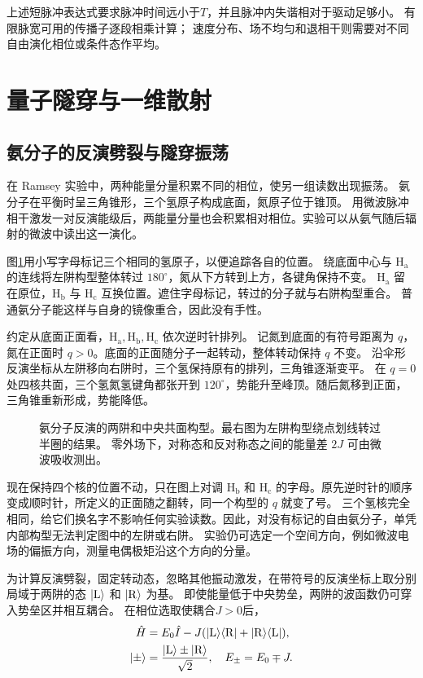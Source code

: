 上述短脉冲表达式要求脉冲时间远小于$T$，并且脉冲内失谐相对于驱动足够小。
有限脉宽可用的传播子逐段相乘计算；
速度分布、场不均匀和退相干则需要对不同自由演化相位或条件态作平均。

\section{量子隧穿与一维散射}
\label{sec:tunneling}
\subsection{氨分子的反演劈裂与隧穿振荡}
在 Ramsey 实验中，两种能量分量积累不同的相位，使另一组读数出现振荡。
氨分子在平衡时呈三角锥形，三个氢原子构成底面，氮原子位于锥顶。
用微波脉冲相干激发一对反演能级后，两能量分量也会积累相对相位。实验可以从氨气随后辐射的微波中读出这一演化。

图\ref{fig:ammonia-inversion}用小写字母标记三个相同的氢原子，以便追踪各自的位置。
绕底面中心与 $\mathrm{H_a}$ 的连线将左阱构型整体转过 $180^\circ$，氮从下方转到上方，各键角保持不变。
$\mathrm{H_a}$ 留在原位，$\mathrm{H_b}$ 与 $\mathrm{H_c}$ 互换位置。遮住字母标记，转过的分子就与右阱构型重合。
普通氨分子能这样与自身的镜像重合，因此没有手性\cite{ammonia-inversion-symmetry}。

约定从底面正面看，$\mathrm{H_a},\mathrm{H_b},\mathrm{H_c}$ 依次逆时针排列。
记氮到底面的有符号距离为 $q$，氮在正面时 $q > 0$。底面的正面随分子一起转动，整体转动保持 $q$ 不变。
沿伞形反演坐标从左阱移向右阱时，三个氢保持原有的排列，三角锥逐渐变平。
在 $q = 0$ 处四核共面，三个氢氮氢键角都张开到 $120^\circ$，势能升至峰顶。随后氮移到正面，三角锥重新形成，势能降低。
\begin{figure}[htbp]
    \centering{}
    \caption{氨分子反演的两阱和中央共面构型。最右图为左阱构型绕点划线转过半圈的结果。
        零外场下，对称态和反对称态之间的能量差 $2J$ 可由微波吸收测出。}
    \label{fig:ammonia-inversion}
\end{figure}

现在保持四个核的位置不动，只在图上对调 $\mathrm{H_b}$ 和 $\mathrm{H_c}$ 的字母。原先逆时针的顺序变成顺时针，所定义的正面随之翻转，同一个构型的 $q$ 就变了号。
三个氢核完全相同，给它们换名字不影响任何实验读数。因此，对没有标记的自由氨分子，单凭内部构型无法判定图中的左阱或右阱\cite{ammonia-inversion-symmetry}。
实验仍可选定一个空间方向，例如微波电场的偏振方向，测量电偶极矩沿这个方向的分量。

为计算反演劈裂，固定转动态，忽略其他振动激发，在带符号的反演坐标上取分别局域于两阱的态 $\lvert\mathrm{L}\rangle$ 和 $\lvert\mathrm{R}\rangle$ 为基\cite{feynman9}。
即使能量低于中央势垒，两阱的波函数仍可穿入势垒区并相互耦合。
在相位选取使耦合$J > 0$后，
\begin{subequations}
    \begin{align}
        \hat{H} &= E_0\hat{I} - J(\lvert\mathrm{L}\rangle\langle\mathrm{R}\rvert + \lvert\mathrm{R}\rangle\langle\mathrm{L}\rvert),\\
        \lvert\pm\rangle &= \frac{\lvert\mathrm{L}\rangle \pm \lvert\mathrm{R}\rangle}{\sqrt2},\quad E_\pm = E_0 \mp J.
    \end{align}
\end{subequations}

